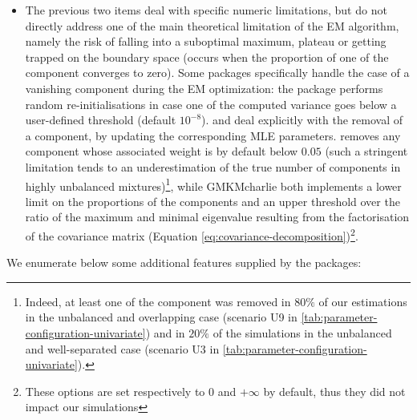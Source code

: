 \begin{itemize}
\tightlist
\item
  The previous two items deal with specific numeric limitations, but do not directly address one of the main theoretical limitation of the EM algorithm, namely the risk of falling into a suboptimal maximum, plateau or getting trapped on the boundary space (occurs when the proportion of one of the component converges to zero). Some packages specifically handle the case of a vanishing component during the EM optimization: the  package performs random re-initialisations in case one of the computed variance goes below a user-defined threshold (default \(10^{-8}\)).  and  deal explicitly with the removal of a component, by updating the corresponding MLE parameters.  removes any component whose associated weight is by default below \(0.05\) (such a stringent limitation tends to an underestimation of the true number of components in highly unbalanced mixtures)\footnote{Indeed, at least one of the component was removed in \(80\%\) of our estimations in the unbalanced and overlapping case (scenario U9 in \ref{tab:parameter-configuration-univariate}) and in \(20\%\) of the simulations in the unbalanced and well-separated case (scenario U3 in \ref{tab:parameter-configuration-univariate}).}, while GMKMcharlie both implements a lower limit on the proportions of the components and an upper threshold over the ratio of the maximum and minimal eigenvalue resulting from the factorisation of the covariance matrix (Equation \eqref{eq:covariance-decomposition})\footnote{These options are set respectively to 0 and \(+\infty\) by default, thus they did not impact our simulations}.
\end{itemize}

We enumerate below some additional features supplied by the packages:

